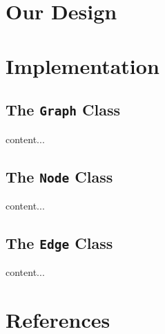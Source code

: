 \documentclass[xcolor={usenames,dvipsnames,svgnames}]{beamer}
\begin{document}
\section{Our Design}

\section{Implementation}
\subsection{The {\tt Graph} Class}
\begin{frame}
content...
\end{frame}
\subsection{The {\tt Node} Class}
\begin{frame}
content...
\end{frame}
\subsection{The {\tt Edge} Class}
\begin{frame}
content...
\end{frame}


\section{References}
\begin{frame}[allowframebreaks]
\nocite{*}
\printbibliography
\end{frame}
\end{document}
